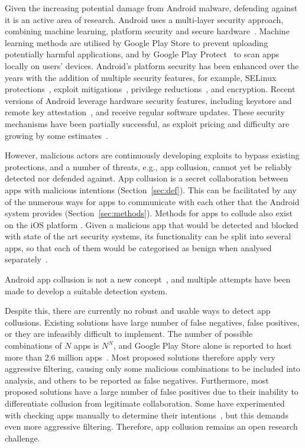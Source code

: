 \documentclass[article, oneside]{aaltoseries}
\newcommand{\TODO}[1]{\todo[inline]{#1}}
\newcommand{\Sref}[1]{Section~\ref{#1}}
\begin{document}
Given the increasing potential damage from Android malware, defending against it is an active area of research. Android uses a multi-layer security approach, combining machine learning, platform security and secure hardware~\cite{AOSP2018}. Machine learning methods are utilised by Google Play Store to prevent uploading potentially harmful applications, and by Google Play Protect~\cite{AOSPplayprotect} to scan apps locally on users' devices. Android's platform security has been enhanced over the years with the addition of multiple security features, for example, SELinux protections~\cite[\href{https://source.android.com/security/selinux}{``Security-Enhanced Linux in Android''}]{AOSPsecurity}, exploit mitigations~\cite{Edge2016}, privilege reductions~\cite{Lawrence2017}, and encryption. Recent versions of Android leverage hardware security features, including keystore and remote key attestation~\cite{Willden2017}, and receive regular software updates. These security mechanisms have been partially successful, as exploit pricing and difficulty are growing by some estimates~\cite{AOSP2018}.

However, malicious actors are continuously developing exploits to bypass existing protections, and a number of threats, e.g., app collusion, cannot yet be reliably detected nor defended against. App collusion is a secret collaboration between apps with malicious intentions (\Sref{sec:def}). This can be facilitated by any of the numerous ways for apps to communicate with each other that the Android system provides (\Sref{sec:methods}). Methods for apps to collude also exist on the iOS platform \cite{Deshotels2016}. Given a malicious app that would be detected and blocked with state of the art security systems, its functionality can be split into several apps, so that each of them would be categorised as benign when analysed separately~\cite{Chen2018}.

Android app collusion is not a new concept~\cite{Schlegel2011}, and multiple attempts have been made to develop a suitable detection system. \TODO{brief overview of existing approaches based on \Sref{sec:approaches}}

Despite this, there are currently no robust and usable ways to detect app collusions. Existing solutions have large number of false negatives, false positives, or they are infeasibly difficult to implement. The number of possible combinations of $N$ apps is $N^N$, and Google Play Store alone is reported to host more than 2.6 million apps~\cite{Statista2018}. Most proposed solutions therefore apply very aggressive filtering, causing only some malicious combinations to be included into analysis, and others to be reported as false negatives. Furthermore, most proposed solutions have a large number of false positives due to their inability to differentiate collusion from legitimate collaboration. Some have experimented with checking apps manually to determine their intentions~\cite{Muttik2016}, but this demands even more aggressive filtering. Therefore, app collusion remains an open research challenge.
\end{document}
